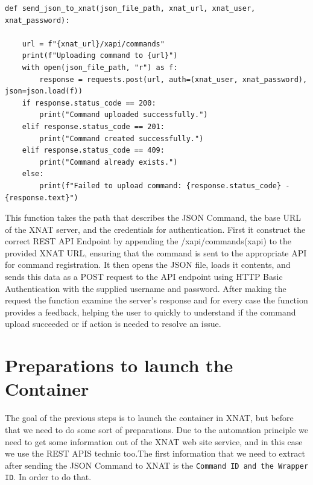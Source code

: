 \begin{lstlisting}
def send_json_to_xnat(json_file_path, xnat_url, xnat_user, xnat_password): 

    url = f"{xnat_url}/xapi/commands"
    print(f"Uploading command to {url}")
    with open(json_file_path, "r") as f:
        response = requests.post(url, auth=(xnat_user, xnat_password), json=json.load(f))
    if response.status_code == 200:
        print("Command uploaded successfully.")
    elif response.status_code == 201:
        print("Command created successfully.")
    elif response.status_code == 409:
        print("Command already exists.")
    else:
        print(f"Failed to upload command: {response.status_code} - {response.text}")

\end{lstlisting}

This function takes the path that describes the JSON Command, the base URL of the XNAT server, and the credentials for authentication. First it construct the correct REST API Endpoint by appending the /xapi/commands(xapi) to the provided XNAT URL, ensuring that the command is sent to the appropriate API for command registration. It then opens the JSON file, loads it contents, and sends this data as a POST request to the API endpoint using \ac{HTTP} Basic Authentication with the supplied username and password. After making the request the function examine the server's response and for every case the function provides a feedback, helping the user to quickly to understand if the command upload succeeded or if action is needed to resolve an issue. 

\section{Preparations to launch the Container}
The goal of the previous steps is to launch the container in XNAT, but before that we need to do some sort of preparations. Due to the automation principle we need to get some information out of the XNAT web site service, and in this case we use the REST APIS technic too.The first information that we need to extract after sending the JSON Command to XNAT is the \texttt{Command ID and the Wrapper ID}.
In order to do that. 
 

